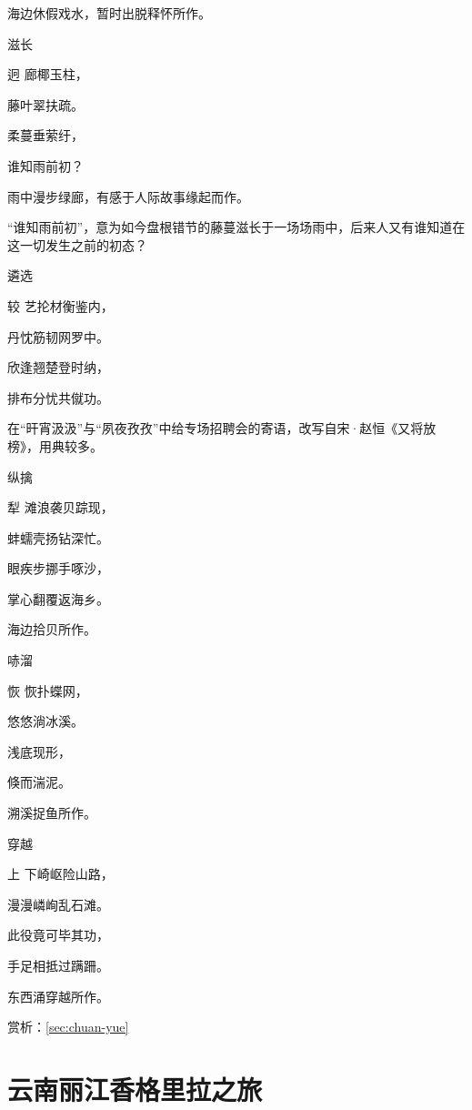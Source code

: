 \documentclass{article}
\newenvironment{poem}[3]{
\begin{minipage}{\textwidth}
\begin{pinyinscope}\begin{center}\Large\linespread{1.4}\selectfont #2\end{center}\end{pinyinscope}
\begin{pinyinscope}
	\begin{center}
	\Large\linespread{1.4}\rmfamily\selectfont #3
}{\end{center}
\end{pinyinscope}
\end{minipage}
}
\begin{document}
海边休假戏水，暂时出脱释怀所作。

\begin{poem}{}{滋长}
迥廊椰玉柱，

藤叶翠扶疏。

柔蔓垂萦纡，

谁知雨前初？
\end{poem}

雨中漫步绿廊，有感于人际故事缘起而作。

“谁知雨前初”，意为如今盘根错节的藤蔓滋长于一场场雨中，后来人又有谁知道在这一切发生之前的初态？

\begin{poem}{}{遴选}
较艺抡材衡鉴内，

丹忱筋韧网罗中。

欣逢翘楚登时纳，

排布分忧共僦功。
\end{poem}

在“旰宵汲汲”与“夙夜孜孜”中给专场招聘会的寄语，改写自宋·赵恒《又将放榜》，用典较多。

\begin{poem}{}{纵擒}
犁滩浪袭贝踪现，

蚌蠕壳扬钻深忙。

眼疾步挪手啄沙，

掌心翻覆返海乡。
\end{poem}

海边拾贝所作。

\begin{poem}{}{哧溜}
恢恢扑蝶网，

悠悠淌冰溪。

浅底现形{}，

倏而{}湍泥。
\end{poem}

溯溪捉鱼所作。

\begin{poem}{}{穿越}
上下崎岖险山路，

漫漫嶙峋乱石滩。

此役竟可毕其功，

手足相抵过蹒跚。
\end{poem}

东西涌穿越所作。

赏析：\ref{sec:chuan-yue}

\section{云南丽江香格里拉之旅}
\end{document}
